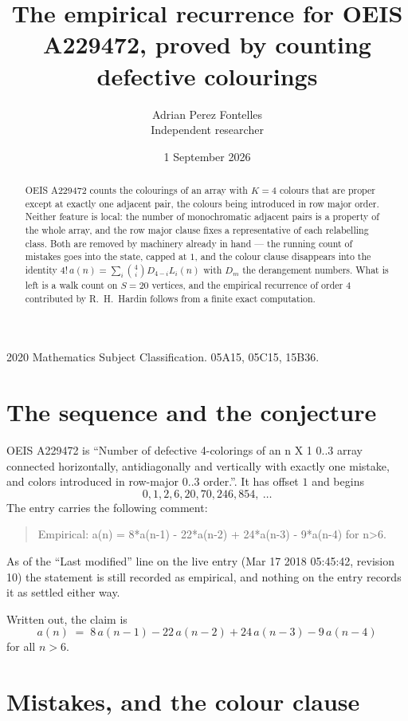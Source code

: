 \documentclass[11pt,a4paper]{article}
\title{The empirical recurrence for OEIS A229472, proved by counting defective colourings}
\author{Adrian Perez Fontelles\\ \small Independent researcher}
\date{1 September 2026}
\theoremstyle{plain}
\theoremstyle{definition}
\begin{document}
\maketitle

\begin{abstract}
OEIS A229472 counts the colourings of an array with $K=4$ colours that are proper except at
exactly one adjacent pair, the colours being introduced in row
major order. Neither feature is local: the number of monochromatic adjacent pairs is a
property of the whole array, and the row major clause fixes a representative of each
relabelling class. Both are removed by machinery already in hand --- the running count of
mistakes goes into the state, capped at $1$, and the colour clause disappears into the
identity $4!\,a(n)=\sum_i\binom{4}{i}D_{4-i}L_i(n)$ with $D_m$ the derangement
numbers. What is left is a walk count on $S=20$ vertices, and the empirical recurrence of
order $4$ contributed by R.~H.~Hardin follows from a finite exact computation.
\end{abstract}

\noindent\small 2020 Mathematics Subject Classification. 05A15, 05C15, 15B36.\normalsize

\section{The sequence and the conjecture}

OEIS A229472 is ``Number of defective 4-colorings of an n X 1 0..3 array connected horizontally, antidiagonally and vertically with exactly one mistake, and colors introduced in row-major 0..3 order.''. It has offset $1$ and begins
\[
0, 1, 2, 6, 20, 70, 246, 854,\ \dots
\]
The entry carries the following comment:
\begin{quote}\small
Empirical: a(n) = 8*a(n-1) - 22*a(n-2) + 24*a(n-3) - 9*a(n-4) for n>6.
\end{quote}
As of the ``Last modified'' line on the live entry (Mar 17 2018 05:45:42, revision 10) the statement is
still recorded as empirical, and nothing on the entry records it as settled either way.

Written out, the claim is
\begin{equation}\label{eq:conj}
a(n)\;=\;8\,a(n-1) - 22\,a(n-2) + 24\,a(n-3) - 9\,a(n-4)
\end{equation}
for all $n>6$.

\section{Mistakes, and the colour clause}
\end{document}
